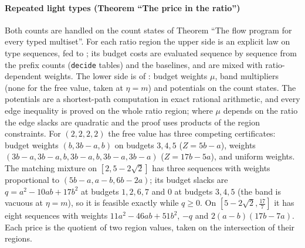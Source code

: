 \paragraph{Repeated light types (Theorem ``The price in the ratio'')} Both counts are handled on the
count states of Theorem ``The flow program for every typed multiset''. For each ratio region the
upper side is an explicit law on type sequences, fed to ; its budget
costs are evaluated sequence by sequence from the prefix counts (\texttt{decide} tables) and the
baselines, and are mixed with ratio-dependent weights. The lower side is  of
: budget
weights $\mu$, band multipliers (none for the free value, taken at $\eta=m$) and potentials on the
count states. The potentials are a shortest-path computation in exact rational arithmetic, and
every edge inequality is proved on the whole ratio region; where $\mu$ depends on the ratio the
edge slacks are quadratic and the proof uses products of the region constraints. For $(2,2,2,2)$
the free value has three competing certificates: budget weights $(b,3b-a,b)$ on budgets $3,4,5$
($Z=5b-a$), weights $(3b-a,3b-a,b,3b-a,b,3b-a,3b-a)$ ($Z=17b-5a$), and uniform weights. The
matching mixture on $[2,5-2\sqrt2]$ has three sequences with weights proportional to
$(5b-a,a-b,6b-2a)$; its budget slacks are $q=a^2-10ab+17b^2$ at budgets $1,2,6,7$ and $0$ at budgets
$3,4,5$ (the band is vacuous at $\eta=m$), so it is feasible exactly while $q\ge0$. On $[5-2\sqrt2,\frac{17}7]$
it has eight sequences with weights $11a^2-46ab+51b^2$, $-q$ and $2(a-b)(17b-7a)$. Each price is the
quotient of two region values, taken on the intersection of their regions.

